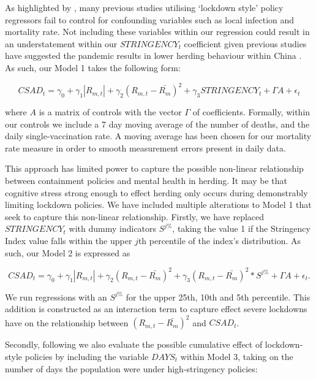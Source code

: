 \documentclass[12pt]{article}
\numberwithin{table}{section}   %
\begin{document}
As highlighted by \citet{aknin}, many previous studies utilising ‘lockdown style’ policy regressors fail to control for confounding variables such as local infection and mortality rate. Not including these variables within our regression could result in an understatement within our $STRINGENCY_t$ coefficient given previous studies have suggested the pandemic results in lower herding behaviour within China \citep{wu}. As such, our Model 1 takes the following form:

\begin{equation}\label{model-2}
CSAD_t=\gamma_0+\gamma_1 |R_{m,t}|+\gamma_2 (R_{m,t}-\bar{R_m})^2+\gamma_3STRINGENCY_t+\Gamma{A}+\epsilon_t
\end{equation}

where $A$ is a matrix of controls with the vector $\Gamma$ of coefficients. Formally, within our controls we include a 7 day moving average of the number of deaths, and the daily single-vaccination rate. A moving average has been chosen for our mortality rate measure in order to smooth measurement errors present in daily data.

This approach has limited power to capture the possible non-linear relationship between containment policies and mental health in herding. It may be that cognitive stress strong enough to effect herding only occurs during demonstrably limiting lockdown policies. We have included multiple alterations to Model 1 that seek to capture this non-linear relationship. Firstly, we have replaced $STRINGENCY_t$ with dummy indicators $S^{j\%}$, taking the value 1 if the Stringency Index value falls within the upper $j$th percentile of the index’s distribution. As such, our Model 2 is expressed as

\begin{equation}\label{model-3}
CSAD_t=\gamma_0+\gamma_1 |R_{m,t}|+\gamma_2 (R_{m,t}-\bar{R_m})^2+\gamma_3(R_{m,t}-\bar{R_m})^2*S^{j\%}+\Gamma{A}+\epsilon_t.
\end{equation}

We run regressions with an $S^{j\%}$ for the upper 25th, 10th and 5th percentile. This addition is constructed as an interaction term to capture effect severe lockdowns have on the relationship between $(R_{m,t}-\bar{R_m})^2$ and $CSAD_t$.

Secondly, following \citet{aknin} we also evaluate the possible cumulative effect of lockdown-style policies by including the variable $DAYS_t$ within Model 3, taking on the number of days the population were under high-stringency policies:
\end{document}
